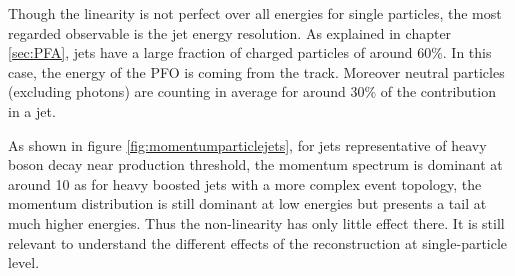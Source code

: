 Though the linearity is not perfect over all energies for single particles, the most regarded observable is the jet energy resolution. As explained in chapter \ref{sec:PFA}, jets have a large fraction of charged particles of around 60\%. In this case, the energy of the PFO is coming from the track. Moreover neutral particles (excluding photons) are counting in average for around 30\% of the contribution in a jet.

As shown in figure \ref{fig:momentumparticlejets}, for jets representative of heavy boson decay near production threshold, the momentum spectrum is dominant at around 10 \GeV as for heavy boosted jets with a more complex event topology, the momentum distribution is still dominant at low energies but presents a tail at much higher energies. Thus the non-linearity has only little effect there. It is still relevant to understand the different effects of the reconstruction at single-particle level.

